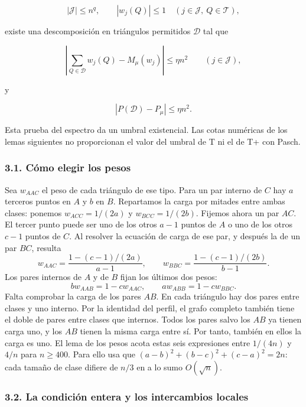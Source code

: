 \documentclass[spanish,11pt,a4paper]{article}
\begin{document}
\[|\mathcal J|\leq n^q,
\qquad |w_j(Q)|\leq1\quad(j\in\mathcal J,\ Q\in\mathcal T),          \tag{2.9}\]

existe una descomposición en triángulos permitidos \(\mathcal D\) tal que

\[\left|\sum_{Q\in\mathcal D}w_j(Q)-M_\mu(w_j)\right|
\leq\eta n^2\qquad(j\in\mathcal J),                                \tag{2.10}\]

y

\[|P(\mathcal D)-P_\mu|\leq\eta n^2.                                \tag{2.11}\]

Esta prueba del espectro da un umbral existencial. Las cotas numéricas de los lemas siguientes no proporcionan el valor del umbral de T ni el de T+ con Pasch.

\subsubsection{3.1. Cómo elegir los pesos}\label{cuxf3mo-elegir-los-pesos}

Sea \(w_{AAC}\) el peso de cada triángulo de ese tipo. Para un par interno de \(C\) hay \(a\) terceros puntos en \(A\) y \(b\) en \(B\). Repartamos la carga por mitades entre ambas clases: ponemos \(w_{ACC}=1/(2a)\) y \(w_{BCC}=1/(2b)\). Fijemos ahora un par \(AC\). El tercer punto puede ser uno de los otros \(a-1\) puntos de \(A\) o uno de los otros \(c-1\) puntos de \(C\). Al resolver la ecuación de carga de ese par, y después la de un par \(BC\), resulta \[w_{AAC}=\frac{1-(c-1)/(2a)}{a-1},\qquad
w_{BBC}=\frac{1-(c-1)/(2b)}{b-1}.\] Los pares internos de \(A\) y de \(B\) fijan los últimos dos pesos: \[b w_{AAB}=1-cw_{AAC},\qquad a w_{ABB}=1-cw_{BBC}.\] Falta comprobar la carga de los pares \(AB\). En cada triángulo hay dos pares entre clases y uno interno. Por la identidad del perfil, el grafo completo también tiene el doble de pares entre clases que internos. Todos los pares salvo los \(AB\) ya tienen carga uno, y los \(AB\) tienen la misma carga entre sí. Por tanto, también en ellos la carga es uno. El lema de los pesos acota estas seis expresiones entre \(1/(4n)\) y \(4/n\) para \(n\ge400\). Para ello usa que \((a-b)^2+(b-c)^2+(c-a)^2=2n\): cada tamaño de clase difiere de \(n/3\) en a lo sumo \(O(\sqrt n)\).

\subsubsection{3.2. La condición entera y los intercambios locales}\label{la-condiciuxf3n-entera-y-los-intercambios-locales}
\end{document}
